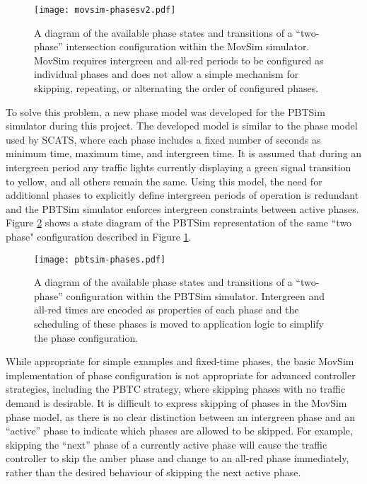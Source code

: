 \begin{figure}[]
\centering
	\texttt{[image: movsim-phasesv2.pdf]}
	\caption[A diagram of a set of phase states for a two-phase intersection within the MovSim simulator.]{ A diagram of the available phase states and transitions of a ``two-phase'' intersection configuration within the MovSim simulator. MovSim requires intergreen and all-red periods to be configured as individual phases and does not allow a simple mechanism for skipping, repeating, or alternating the order of configured phases. }
\label{movsimphasediagram}
\end{figure}

To solve this problem, a new phase model was developed for the PBTSim simulator during this project. The developed model is similar to the phase model used by SCATS, where each phase includes a fixed number of seconds as minimum time, maximum time, and intergreen time. It is assumed that during an intergreen period any traffic lights currently displaying a green signal transition to yellow, and all others remain the same. Using this model, the need for additional phases to explicitly define intergreen periods of operation is redundant and the PBTSim simulator enforces intergreen constraints between active phases. Figure \ref{pbtsim-phase-diagram} shows a state diagram of the PBTSim representation of the same ``two phase" configuration described in Figure \ref{movsimphasediagram}.

\begin{figure}[]
\centering
	\texttt{[image: pbtsim-phases.pdf]}
	\caption[A diagram of a set of phase states for a two-phase intersection within the PBTSim simulator.]{ A diagram of the available phase states and transitions of a ``two-phase'' configuration within the PBTSim simulator. Intergreen and all-red times are encoded as properties of each phase and the scheduling of these phases is moved to application logic to simplify the phase configuration. }
\label{pbtsim-phase-diagram}
\end{figure}

While appropriate for simple examples and fixed-time phases, the basic MovSim implementation of phase configuration is not appropriate for advanced controller strategies, including the PBTC strategy, where skipping phases with no traffic demand is desirable. It is difficult to express skipping of phases in the MovSim phase model, as there is no clear distinction between an intergreen phase and an ``active'' phase to indicate which phases are allowed to be skipped. For example, skipping the ``next'' phase of a currently active phase will cause the traffic controller to skip the amber phase and change to an all-red phase immediately, rather than the desired behaviour of skipping the next active phase.

